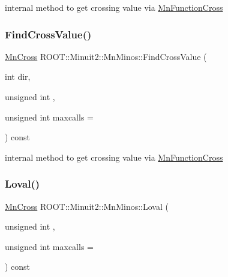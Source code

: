 internal method to get crossing value via \mbox{\hyperlink{classROOT_1_1Minuit2_1_1MnFunctionCross}{Mn\+Function\+Cross}} 

\mbox{\label{classROOT_1_1Minuit2_1_1MnMinos_a4b8df109769bd0bee2127da68615bb11}} 
\subsubsection{\texorpdfstring{FindCrossValue()}{FindCrossValue()}\hspace{0.1cm}{\footnotesize\ttfamily [3/3]}}
{\footnotesize\ttfamily \mbox{\hyperlink{classROOT_1_1Minuit2_1_1MnCross}{Mn\+Cross}} R\+O\+O\+T\+::\+Minuit2\+::\+Mn\+Minos\+::\+Find\+Cross\+Value (\begin{DoxyParamCaption}\item[{int}]{dir,  }\item[{unsigned int}]{,  }\item[{unsigned int}]{maxcalls = {} }\end{DoxyParamCaption}) const\hspace{0.3cm}{\ttfamily [protected]}}



internal method to get crossing value via \mbox{\hyperlink{classROOT_1_1Minuit2_1_1MnFunctionCross}{Mn\+Function\+Cross}} 

\mbox{\label{classROOT_1_1Minuit2_1_1MnMinos_a708381f90e4bd9118dec60726a1bdf73}} 
\subsubsection{\texorpdfstring{Loval()}{Loval()}\hspace{0.1cm}{\footnotesize\ttfamily [1/3]}}
{\footnotesize\ttfamily \mbox{\hyperlink{classROOT_1_1Minuit2_1_1MnCross}{Mn\+Cross}} R\+O\+O\+T\+::\+Minuit2\+::\+Mn\+Minos\+::\+Loval (\begin{DoxyParamCaption}\item[{unsigned int}]{,  }\item[{unsigned int}]{maxcalls = {} }\end{DoxyParamCaption}) const}

